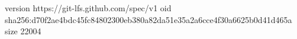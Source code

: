 version https://git-lfs.github.com/spec/v1
oid sha256:d70f2ae4bdc45fc84802300eb380a82da51e35a2a6cce4f30a6625b0d41d465a
size 22004
